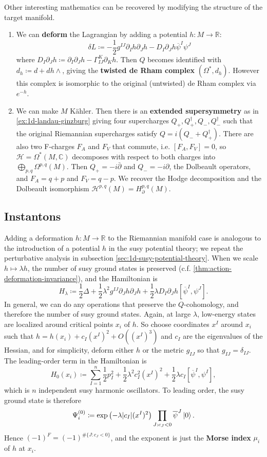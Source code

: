 \documentclass{report}
\theoremstyle{plain}
\theoremstyle{definition}
\theoremstyle{remark}
\newcommand{\di}{\partial}
\newcommand{\bC}{\mathbb{C}}
\newcommand{\bR}{\mathbb{R}}
\newcommand{\cH}{\mathcal{H}}
\newcommand{\bdi}{\bar{\di}}
\newcommand{\cnj}{\overline}
\begin{document}
Other interesting mathematics can be recovered by modifying the
structure of the target manifold.
\begin{enumerate}
\item We can {\bf deform} the Lagrangian by adding a potential
  $h\colon M \to \bR$:
  \[ \delta L \coloneqq -\frac{1}{2} g^{IJ} \di_I h \di_J h - D_I \di_J h \cnj \psi^I \psi^J \]
  where $D_I \di_J h \coloneqq \di_I \di_J h - \Gamma^K_{IJ} \di_K h$.
  Then $Q$ becomes identified with $d_h\coloneqq d + dh \wedge$,
  giving the {\bf twisted de Rham complex} $(\Omega^*, d_h)$. However
  this complex is isomorphic to the original (untwisted) de Rham
  complex via $e^{-h}$.
\item We can make $M$ K\"ahler. Then there is an {\bf extended
  supersymmetry} as in \ref{ex:1d-landau-ginzburg} giving four
  supercharges $Q_+, Q_+^\dag, Q_-, Q_-^\dag$ such that the original
  Riemannian supercharges satisfy $Q = i(Q_- + Q_+^\dag)$. There are
  also two F-charges $F_A$ and $F_V$ that commute, i.e. $[F_A, F_V] =
  0$, so $\cH = \Omega^*(M, \bC)$ decomposes with respect to both
  charges into $\bigoplus_{p,q} \Omega^{p,q}(M)$. Then $Q_+ = -i\bdi$
  and $Q_- = -i\di$, the Dolbeault operators, and $F_A = q+p$ and $F_V
  = q-p$. We recover the Hodge decomposition and the Dolbeault
  isomorphism $\cH^{p,q}(M) = H^{p,q}_{\di}(M)$.
\end{enumerate}

\subsection{Instantons}

Adding a deformation $h\colon M \to \bR$ to the Riemannian manifold
case is analogous to the introduction of a potential $h$ in the susy
potential theory; we repeat the perturbative analysis in subsection
\ref{sec:1d-susy-potential-theory}. When we scale $h \mapsto \lambda
h$, the number of susy ground states is preserved (c.f.
\ref{thm:action-deformation-invariance}), and the Hamiltonian is
\[ H_\lambda \coloneqq \frac{1}{2} \Delta + \frac{1}{2} \lambda^2 g^{IJ} \di_J h \di_J h + \frac{1}{2} \lambda D_I \di_J h[\cnj\psi^I, \psi^J]. \]
In general, we can do any operations that preserve the $Q$-cohomology,
and therefore the number of susy ground states. Again, at large
$\lambda$, low-energy states are localized around critical points
$x_i$ of $h$. So choose coordinates $x^I$ around $x_i$ such that $h =
h(x_i) + c_I (x^I)^2 + O((x^I)^3)$ and $c_I$ are the eigenvalues of
the Hessian, and for simplicity, deform either $h$ or the metric
$g_{IJ}$ so that $g_{IJ} = \delta_{IJ}$. The leading-order term in the
Hamiltonian is
\[ H_0(x_i) \coloneqq \sum_{I=1}^n \frac{1}{2} p_I^2 + \frac{1}{2} \lambda^2 c_I^2 (x^I)^2 + \frac{1}{2} \lambda c_I [\cnj\psi^I, \psi^I], \]
which is $n$ independent susy harmonic oscillators. To leading order,
the susy ground state is therefore
\[ \Psi_i^{(0)} \coloneqq \exp\left(-\lambda |c_I| (x^I)^2\right) \prod_{J : c_J < 0} \cnj\psi^J \ket{0}. \]
Hence $(-1)^F = (-1)^{\#\{J: c_J < 0\}}$, and the exponent is just the
{\bf Morse index} $\mu_i$ of $h$ at $x_i$.
\end{document}
